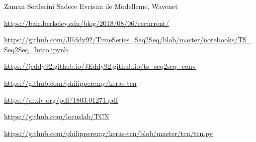 \documentclass[12pt,fleqn]{article}\usepackage{../../common}
\begin{document}
Zaman Serilerini Sadece Evrisim ile Modelleme, Wavenet 











\url{https://bair.berkeley.edu/blog/2018/08/06/recurrent/}

\url{https://github.com/JEddy92/TimeSeries_Seq2Seq/blob/master/notebooks/TS_Seq2Seq_Intro.ipynb}

\url{https://jeddy92.github.io/JEddy92.github.io/ts_seq2seq_conv}

\url{https://github.com/philipperemy/keras-tcn}

\url{https://arxiv.org/pdf/1803.01271.pdf}

\url{https://github.com/locuslab/TCN}

\url{https://github.com/philipperemy/keras-tcn/blob/master/tcn/tcn.py}
\end{document}
